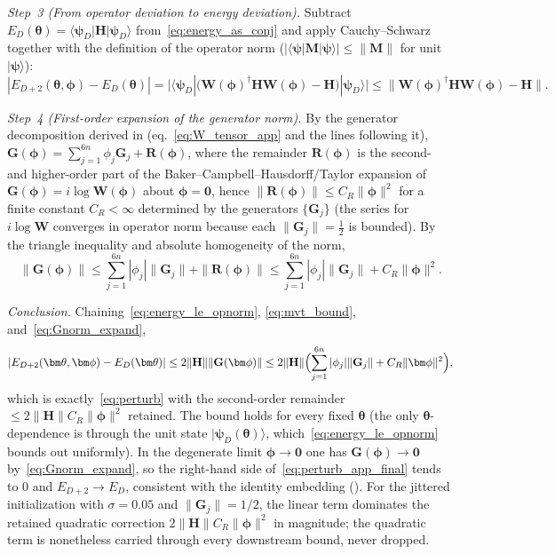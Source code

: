 \documentclass[11pt]{article}
\theoremstyle{plain}
\theoremstyle{plain}
\begin{document}
\emph{Step~3 (From operator deviation to energy deviation).}
Subtract $E_D(\bm\theta)=\langle\boldsymbol{\psi}_D|\mathbf{H}|\boldsymbol{\psi}_D\rangle$
from~\eqref{eq:energy_as_conj} and apply Cauchy--Schwarz together with
the definition of the operator norm
($|\langle\boldsymbol{\psi}|\mathbf{M}|\boldsymbol{\psi}\rangle|\le\|\mathbf{M}\|$ for unit
$|\boldsymbol{\psi}\rangle$):
\begin{equation}\label{eq:energy_le_opnorm}
  |E_{D+2}(\bm\theta,\bm\phi)-E_D(\bm\theta)|
  =\bigl|\langle\boldsymbol{\psi}_D|
     \bigl(\mathbf{W}(\bm\phi)^\dagger\mathbf{H} \mathbf{W}(\bm\phi)-\mathbf{H}\bigr)
     |\boldsymbol{\psi}_D\rangle\bigr|
  \le\bigl\|\mathbf{W}(\bm\phi)^\dagger\mathbf{H} \mathbf{W}(\bm\phi)-\mathbf{H}\bigr\|.
\end{equation}

\emph{Step~4 (First-order expansion of the generator norm).}
By the generator decomposition derived in 
(eq.~\eqref{eq:W_tensor_app} and the lines following it),
$\mathbf{G}(\bm\phi)=\sum_{j=1}^{6n}\phi_j\mathbf{G}_j+\mathbf{R}(\bm\phi)$, where the
remainder $\mathbf{R}(\bm\phi)$ is the second- and higher-order part of the
Baker--Campbell--Hausdorff/Taylor expansion of
$\mathbf{G}(\bm\phi)=i\log\mathbf{W}(\bm\phi)$ about $\bm\phi=\bm0$, hence
$\|\mathbf{R}(\bm\phi)\|\le C_R\|\bm\phi\|^2$ for a finite constant $C_R<\infty$
determined by the generators $\{\mathbf{G}_j\}$ (the series for $i\log\mathbf{W}$
converges in operator norm because each $\|\mathbf{G}_j\|=\tfrac12$ is bounded).
By the triangle inequality and absolute homogeneity of the norm,
\begin{equation}\label{eq:Gnorm_expand}
  \|\mathbf{G}(\bm\phi)\|
  \le\sum_{j=1}^{6n}|\phi_j| \|\mathbf{G}_j\|+\|\mathbf{R}(\bm\phi)\|
  \le\sum_{j=1}^{6n}|\phi_j| \|\mathbf{G}_j\|+C_R\|\bm\phi\|^2.
\end{equation}

\emph{Conclusion.}
Chaining~\eqref{eq:energy_le_opnorm}, \eqref{eq:mvt_bound},
and~\eqref{eq:Gnorm_expand},
\begin{equation}\label{eq:perturb_app_final}
  |E_{D+2}(\bm\theta,\bm\phi)-E_D(\bm\theta)|
  \le 2 \|\mathbf{H}\| \|\mathbf{G}(\bm\phi)\|
  \le 2 \|\mathbf{H}\|\Bigl(\sum_{j=1}^{6n}|\phi_j| \|\mathbf{G}_j\|
     +C_R\|\bm\phi\|^2\Bigr),
\end{equation}
which is exactly~\eqref{eq:perturb} with the second-order remainder
$\le 2\|\mathbf{H}\|C_R\|\bm\phi\|^2$ retained.  The bound holds for every fixed
$\bm\theta$ (the only $\bm\theta$-dependence is through the unit state
$|\boldsymbol{\psi}_D(\bm\theta)\rangle$, which~\eqref{eq:energy_le_opnorm}
bounds out uniformly).  In the degenerate limit $\bm\phi\to\bm0$ one
has $\mathbf{G}(\bm\phi)\to\mathbf{0}$ by~\eqref{eq:Gnorm_expand}, so the
right-hand side of~\eqref{eq:perturb_app_final} tends to $0$ and
$E_{D+2}\to E_D$, consistent with the identity embedding
().  For the jittered initialization with
$\sigma=0.05$ and $\|\mathbf{G}_j\|=1/2$, the linear term dominates the retained
quadratic correction $2\|\mathbf{H}\|C_R\|\bm\phi\|^2$ in magnitude; the quadratic
term is nonetheless carried through every downstream bound, never dropped.
\end{document}
